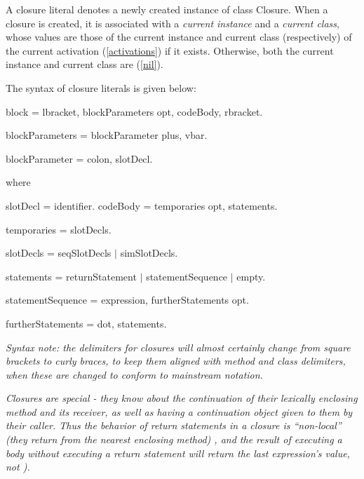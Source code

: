 \documentclass{article}
\newcommand{\code}[1]{{\sf #1}}
\begin{document}
A closure literal denotes a newly created instance of class \code{Closure}. When a closure is created, it is associated with a {\em current instance} and a {\em current class}, whose values are those of the current instance and current class (respectively) of the current activation  (\ref{activations}) if it exists. Otherwise, both the current instance and current class are \NIL{} (\ref{nil}). 

The syntax of closure literals is given below: 

\begin{newspeak}
 block = lbracket,  blockParameters opt, codeBody,  rbracket.
 
blockParameters =  blockParameter plus, vbar.
 
blockParameter = colon, slotDecl.                                 
\end{newspeak}

where
\begin{newspeak}
slotDecl = identifier.     
codeBody = temporaries opt,  statements.    
  
temporaries = slotDecls.
  
slotDecls = seqSlotDecls $|$ 
                      simSlotDecls.
  
statements = returnStatement  $|$   
                  statementSequence $|$
                  empty.
                         
statementSequence = expression, furtherStatements  opt.
  
furtherStatements = dot,  statements.                           
\end{newspeak}

{\it
Syntax note: the delimiters for closures will almost certainly change from square brackets to curly braces, to keep them aligned with method and class delimiters, when these are changed to conform to mainstream notation.
}

{\it
Closures are special - they know about the continuation of their lexically enclosing method and its receiver, as well as having a continuation object given to them by their caller. Thus the behavior of return statements in a closure  is ``non-local'' (they return from the nearest enclosing method) ,  and the result of executing a body without executing a return statement  will return the last expression's value, not \SELF).
}
\end{document}
